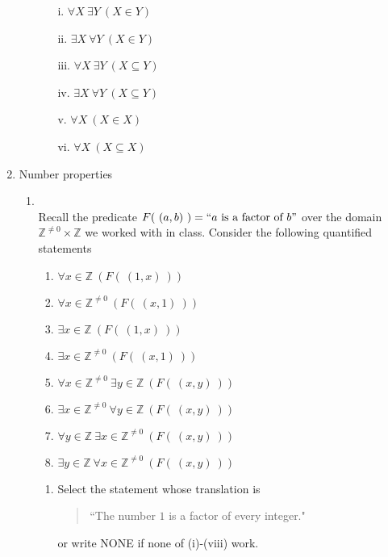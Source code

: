 \documentclass[12pt, oneside]{article}
\begin{document}
\begin{enumerate}
\begin{enumerate}
\begin{enumerate}
\item[i.] $\forall X ~\exists Y ~(X \in Y)$
\item[ii.] $\exists X ~\forall Y ~(X \in Y)$
\item[iii.] $\forall X ~\exists Y ~(X \subseteq Y)$
\item[iv.] $\exists X ~\forall Y ~(X \subseteq Y)$
\item[v.] $\forall X ~(X \in X)$
\item[vi.] $\forall X ~(X \subseteq X)$ 
\end{enumerate} \end{enumerate}
\item Number properties\begin{enumerate}
    \item \hspace{1in}\\ 

Recall the predicate  $F(~(a,b)~)  = ``a \text{ is a factor of } b"$ over  
the domain $\mathbb{Z}^{\neq 0} \times \mathbb{Z}$ we worked with 
in class. Consider the following quantified
statements
\begin{multicols}{2}
\begin{enumerate}[label=(\roman*)]
\item $\forall x \in \mathbb{Z} ~(F(~(1,x)~))$
\item $\forall x \in \mathbb{Z}^{\neq 0} ~(F(~(x,1)~))$
\item $\exists x \in \mathbb{Z} ~(F(~(1,x)~))$
\item $\exists x \in \mathbb{Z}^{\neq 0} ~(F(~(x,1)~))$
\item $\forall x \in \mathbb{Z}^{\neq 0} ~\exists y \in \mathbb{Z} ~(F(~(x,y)~))$
\item $\exists x \in \mathbb{Z}^{\neq 0} ~\forall y \in \mathbb{Z} ~(F(~(x,y)~))$
\item $\forall y \in \mathbb{Z} ~\exists x \in \mathbb{Z}^{\neq 0} ~(F(~(x,y)~))$
\item $\exists y \in \mathbb{Z} ~\forall x \in \mathbb{Z}^{\neq 0} ~(F(~(x,y)~))$
\end{enumerate}
\end{multicols}
\begin{enumerate}
\item Select the statement whose translation is
\begin{quote}
``The number $1$ is  a factor of every integer."
\end{quote}
or write NONE if none of (i)-(viii) work.


\end{enumerate}
\end{enumerate}
\end{enumerate}
\end{document}
